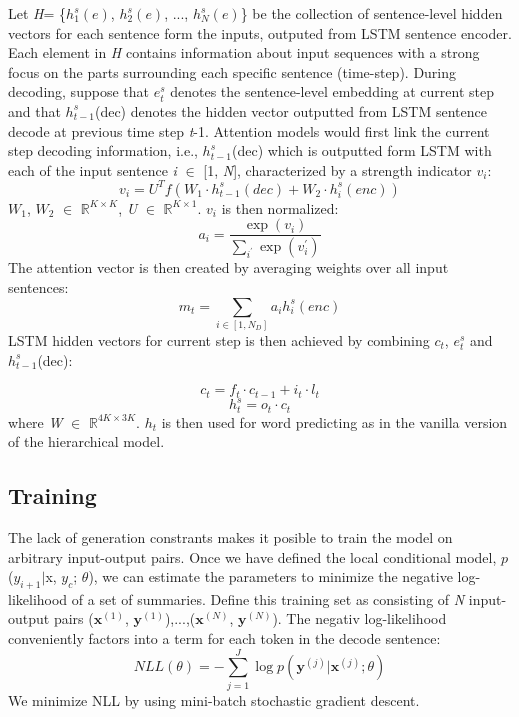 \documentclass[letterpaper]{article}
\begin{document}
Let \textit{H}= \{$h_{1}^{s}(e)$, $h_{2}^{s}(e)$, ..., $h_{N}^{s}(e)$\} be the collection of sentence-level hidden vectors for each sentence form the inputs, outputed from LSTM sentence encoder. Each element in \textit{H} contains information about input sequences with a strong focus on the parts surrounding each specific sentence (time-step). During decoding, suppose that \textit{$e_{t}^{s}$} denotes the sentence-level embedding at current step and that \textit{$h_{t-1}^{s}$}(dec) denotes the hidden vector outputted from LSTM sentence decode at previous time step \textit{t}-1. Attention models would first link the current step decoding information, i.e., \textit{$h_{t-1}^{s}$}(dec) which is outputted form LSTM with each of the input sentence \textit{i} $\in$ [1, \textit{N}], characterized by a strength indicator \textit{$v_{i}$}:
\begin{equation}\label{key}
v_{i} = U^{T}f(W_{1} \cdot h_{t-1}^{s}(dec) + W_{2} \cdot h_{i}^{s}(enc))
\end{equation}
\textit{$W_{1}$}, \textit{$W_{2}$} $\in$ $\mathbb{R}^{K \times K}$, \textit{U} $\in$ $\mathbb{R}^{K \times 1}$. \textit{$v_{i}$} is then normalized:
\begin{equation}\label{key}
a_{i}=\frac{\exp(v_{i})}{\sum_{i^{'}}\exp(v_{i}^{'})}
\end{equation}
The attention vector is then created by averaging weights over all input sentences:
\begin{equation}\label{key}
m_{t}=\sum_{i \in [1, N_{D}]}a_{i}h_{i}^{s}(enc)
\end{equation}
LSTM hidden vectors for current step is then achieved by combining \textit{$c_{t}$}, \textit{$e_{t}^{s}$} and \textit{$h_{t-1}^{s}$}(dec):

\begin{equation}\label{key}
c_{t} = f_{t} \cdot c_{t-1} + i_{t} \cdot l_{t}
\end{equation}
\begin{equation}\label{key}
h_{t}^{s} = o_{t} \cdot c_{t}
\end{equation}
where \textit{W} $\in$ $\mathbb{R}^{4K \times 3K}$. \textit{$h_{t}$} is then used for word predicting as in the vanilla version of the hierarchical model.

\subsection{Training}
The lack of generation constrants makes it posible to train the model on arbitrary input-output pairs. Once we have defined the local conditional model, \textit{$p$}($y_{i+1}$$|$x, $y_{c}$; $\theta$), we can estimate the parameters to minimize the negative log-likelihood of a set of summaries. Define this training set as consisting of \textit{N} input-output pairs ($\textbf{x}^{(1)}$, $\textbf{y}^{(1)}$),...,($\textbf{x}^{(N)}$, $\textbf{y}^{(N)}$). The negativ log-likelihood conveniently factors into a term for each token in the decode sentence:
\begin{equation}\label{key}
NLL(\theta)=-\sum_{j=1}^{J}\log p(\mathbf{y}^{(j)}|\mathbf{x}^{(j)};\theta)
\end{equation}
We minimize NLL by using mini-batch stochastic gradient descent.
\end{document}
